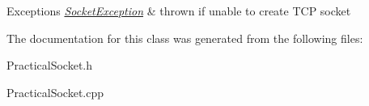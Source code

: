 \begin{DoxyExceptions}{Exceptions}
{\em \hyperlink{classSocketException}{Socket\-Exception}} & thrown if unable to create T\-C\-P socket \\
\hline
\end{DoxyExceptions}


The documentation for this class was generated from the following files\-:\begin{DoxyCompactItemize}
\item 
Practical\-Socket.\-h\item 
Practical\-Socket.\-cpp\end{DoxyCompactItemize}
